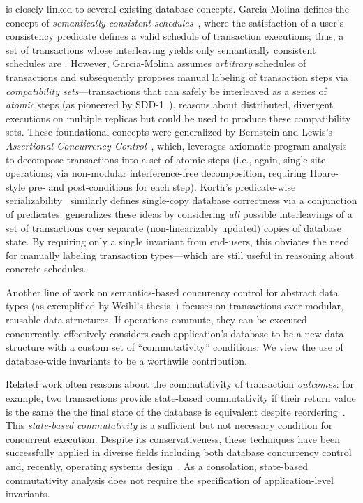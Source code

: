 \iconfluence is closely linked to several existing database
concepts. Garcia-Molina defines the concept of \textit{semantically
  consistent schedules}~\cite{garciamolina-semantics}, where the
satisfaction of a user's consistency predicate defines a valid
schedule of transaction executions; thus, a set of transactions whose
interleaving yields only semantically consistent schedules are
\iconfluent. However, Garcia-Molina assumes \textit{arbitrary}
schedules of transactions and subsequently proposes manual labeling of
transaction steps via \textit{compatibility sets}---transactions that
can safely be interleaved as a series of \textit{atomic} steps (as
pioneered by SDD-1~\cite{sdd1}). \iconfluence reasons about
distributed, divergent executions on multiple replicas but could be
used to produce these compatibility sets. These foundational concepts
were generalized by Bernstein and Lewis's \textit{Assertional
  Concurrency Control}~\cite{decomp-semantics}, which, leverages
axiomatic program analysis to decompose transactions into a set of
atomic steps (i.e., again, single-site operations; via non-modular
interference-free decomposition, requiring Hoare-style pre- and
post-conditions for each step). Korth's predicate-wise
serializability~\cite{korth-serializability} similarly defines
single-copy database correctness via a conjunction of
predicates. \iconfluence generalizes these ideas by considering
\textit{all} possible interleavings of a set of transactions over
separate (non-linearizably updated) copies of database state. By
requiring only a single invariant from end-users, this obviates the
need for manually labeling transaction types---which are still useful
in reasoning about concrete schedules.

Another line of work on semantics-based concurency control for
abstract data types (as exemplified by Weihl's
thesis~\cite{weihl-thesis}) focuses on transactions over modular,
reusable data structures. If operations commute, they can be executed
concurrently. \iconfluence effectively considers each application's
database to be a new data structure with a custom set of
``commutativity'' conditions. We view the use of database-wide
invariants to be a worthwile contribution.

 Related work often reasons about
the commutativity of transaction \textit{outcomes}: for example, two
transactions provide state-based commutativity if their return value
is the same the the final state of the database is equivalent despite
reordering~\cite{weihl-data,weihl-thesis}. This \textit{state-based
  commutativity} is a sufficient but not necessary condition for
concurrent execution. Despite its conservativeness, these techniques
have been successfully applied in diverse fields including both
database concurrency control and, recently, operating systems
design~\cite{kohler-commutativity}. As a consolation, state-based
commutativity analysis does not require the specification of
application-level invariants.


